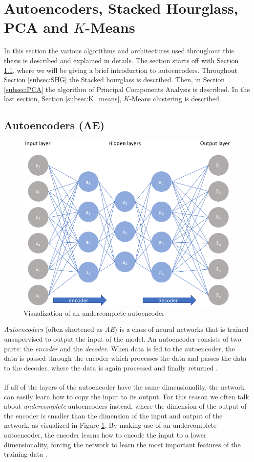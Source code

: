 \documentclass[./main.tex]{subfiles}
\begin{document}
\section{Autoencoders, Stacked Hourglass, PCA and $K$-Means}\label{sec:algorithms}
In this section the various algorithms and architectures used throughout this thesis is described and explained in details. The section starts off with Section \ref{subsec:AE}, where we will be giving a brief introduction to autoencoders. Throughout Section \ref{subsec:SHG} the Stacked hourglass is described. Then, in Section \ref{subsec:PCA} the algorithm of Principal Components Analysis is described. In the last section, Section \ref{subsec:K_means}, $K$-Means clustering is described.

\subsection{Autoencoders (AE)}\label{subsec:AE}
\begin{figure}[htbp]
    \centering
    \includegraphics[width = 7 cm]{entities/AE.png}
    \caption{Visualization of an undercomplete autoencoder \cite{AE}}
    \label{fig:AE}
\end{figure}
\noindent \textit{Autoencoders} (often shortened as \textit{AE}) is a class of neural networks that is trained unsupervised to output the input of the model. An autoencoder consists of two parts: the \textit{encoder} and the \textit{decoder}. When data is fed to the autoencoder, the data is passed through the encoder which processes the data and passes the data to the decoder, where the data is again processed and finally returned \cite{DeepLearning}. 
\\
\\
If all of the layers of the autoencoder have the same dimensionality, the network can easily learn how to copy the input to its output. For this reason we often talk about \textit{undercomplete} autoencoders instead, where the dimension of the output of the encoder is smaller than the dimension of the input and output of the network, as visualized in Figure \ref{fig:AE}. By making use of an undercomplete autoencoder, the encoder learns how to encode the input to a lower dimensionality, forcing the network to learn the most important features of the training data \cite{DeepLearning}.
\end{document}
